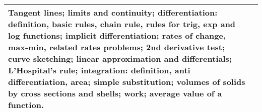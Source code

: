 \documentclass[12pt]{article}
\begin{document}
\begin{minipage}{\textwidth}
\begin{tabularx}{\textwidth}{|l|X|}
\begin{minipage}{.70\textwidth}
					Tangent lines; limits and continuity; differentiation: definition, basic rules, chain rule, rules for trig, exp and log functions; implicit differentiation; rates of change, max-min, related rates problems; 2nd derivative test; curve sketching; linear approximation and differentials; L'Hospital's rule; integration: definition, anti differentiation, area; simple substitution; volumes of solids by cross sections and shells; work; average value of a function.
					
					\vspace{3mm}
					\end{minipage} \\ \hline
\end{tabularx}
\end{minipage}

\bigskip
\bigskip
\end{document}

